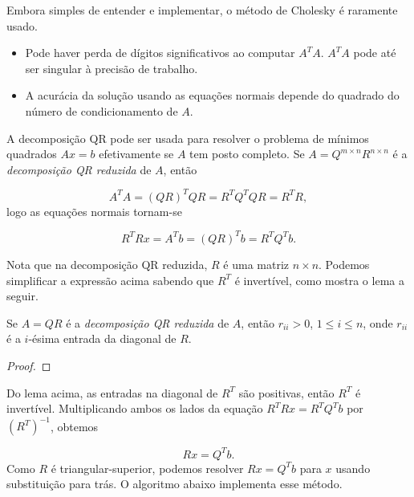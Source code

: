 \documentclass{article}
\begin{document}
Embora simples de entender e implementar, o método de Cholesky é raramente usado.

\begin{itemize}
    \item Pode haver perda de dígitos significativos ao computar \(A^TA\). \(A^TA\) pode até ser singular à precisão de trabalho.
    \item A acurácia da solução usando as equações normais depende do quadrado do número de condicionamento de \(A\).
\end{itemize}

A decomposição QR pode ser usada para resolver o problema de mínimos quadrados \(Ax=b\) efetivamente se \(A\) tem posto completo. Se \(A = Q^{m \times n} R^{n \times n}\) é a \emph{decomposição QR reduzida} de \(A\), então

\begin{equation}
    A^T A = (Q R)^T Q R = R^T Q^T Q R = R^T R,
\end{equation} logo as equações normais tornam-se

\begin{equation}
    R^T R x = A^T b = (Q R)^T b = R^T Q^T b.
\end{equation}

Nota que na decomposição QR reduzida, \(R\) é uma matriz \(n \times n\). Podemos simplificar a expressão acima sabendo que \(R^T\) é invertível, como mostra o lema a seguir.

\begin{lem}
    Se \(A = QR\) é a \emph{decomposição QR reduzida} de \(A\), então \(r_{ii} > 0\), \(1 \leq i \leq n\), onde \(r_{ii}\) é a \(i\)-ésima entrada da diagonal de \(R\).
\end{lem}

\begin{proof}
    
\end{proof}

Do lema acima, as entradas na diagonal de \(R^T\) são positivas, então \(R^T\) é invertível. Multiplicando ambos os lados da equação \(R^T R x = R^T Q^T b\) por \((R^T)^{-1}\), obtemos

\begin{equation}
    R x = Q^T b.
\end{equation} Como \(R\) é triangular-superior, podemos resolver \(Rx = Q^Tb\) para \(x\) usando substituição para trás. O algoritmo abaixo implementa esse método.
\end{document}
